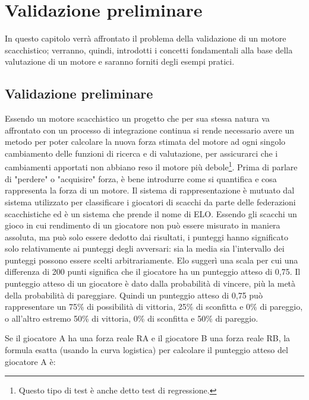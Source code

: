 \chapter{Validazione preliminare} %
%


\begin{citazione}
In questo capitolo verrà affrontato il problema della validazione di un motore scacchistico; verranno, quindi, introdotti i concetti fondamentali alla base della valutazione di un motore e saranno forniti 
degli esempi pratici.
\end{citazione}

\newpage
\section*{Validazione preliminare}
Essendo un motore scacchistico un progetto che per sua stessa natura va affrontato con un processo di integrazione continua si rende necessario avere un metodo 
per poter calcolare la nuova forza stimata del motore  ad ogni singolo cambiamento  delle funzioni di ricerca e di valutazione, per assicurarci che i cambiamenti apportati non abbiano reso il motore più debole\footnote{Questo tipo di test è anche detto test di regressione.}.
Prima di parlare di "perdere" o "acquisire" forza, è bene introdurre come si quantifica e cosa rappresenta la forza di un motore. Il sistema di rappresentazione è mutuato dal sistema utilizzato per classificare i 
giocatori di scacchi da parte delle federazioni scacchistiche ed è un sistema che prende il nome di ELO. Essendo gli scacchi un gioco in cui  rendimento di un giocatore non può essere misurato in maniera assoluta,
ma può solo essere dedotto dai risultati, i punteggi hanno significato solo relativamente ai punteggi degli avversari: 
sia la media sia l'intervallo dei punteggi possono essere scelti arbitrariamente. Elo suggerì una scala per cui una differenza di 200 punti significa che il giocatore ha un punteggio atteso di 0,75.
Il punteggio atteso di un giocatore è dato dalla probabilità di vincere, più la metà della probabilità di pareggiare. Quindi un punteggio atteso di 0,75 può rappresentare un 75\% di possibilità di vittoria, 
25\% di sconfitta e 0\% di pareggio, o all'altro estremo 50\% di vittoria, 0\% di sconfitta e 50\% di pareggio.

Se il giocatore A ha una forza reale RA e il giocatore B una forza reale RB, la formula esatta (usando la curva logistica) per calcolare il punteggio atteso del giocatore A è:

